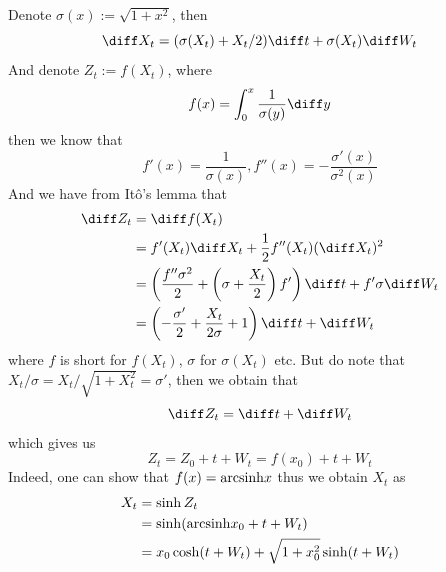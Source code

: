 \begin{subproblem}
        \item
        Denote
        $\sigma(x):=\sqrt{1+x^2}$, then
        \[\diff X_t=(\sigma(X_t)+X_t/2)\diff t+\sigma(X_t)\diff W_t\]
        And denote $Z_t:=f(X_t)$, where
        \[f(x)=\int_0^x\frac{1}{\sigma(y)}\diff y\]
        then we know that
        \[f'(x)=\frac{1}{\sigma(x)},f''(x)=-\frac{\sigma'(x)}{\sigma^2(x)}\]
        And we have from It\^o's lemma that
        \[\begin{aligned}
            \diff Z_t&=\diff f(X_t)\\
            &=f'(X_t)\diff X_t+\frac{1}{2}f''(X_t)(\diff X_t)^2\\
            &=\left(\frac{f''\sigma^2}{2}
            +\left(\sigma+\frac{X_t}{2}\right)f'\right)\diff t
            +f'\sigma\diff W_t\\
            &=\left(-\frac{\sigma'}{2}+\frac{X_t}{2\sigma}+1\right)\diff t+\diff W_t
        \end{aligned}\]
        where $f$ is short for $f(X_t)$, $\sigma$ for $\sigma(X_t)$ etc.
        But do note that $X_t/\sigma=X_t/\sqrt{1+X_t^2}=\sigma'$, then
        we obtain that
        \[\diff Z_t=\diff t+\diff W_t\]
        which gives us
        \[Z_t=Z_0+t+W_t=f(x_0)+t+W_t\]
        Indeed, one can show that $f(x)=\mathrm{arcsinh} x$
        thus we obtain $X_t$ as
        \[\begin{aligned}
            X_t&=\sinh Z_t\\
            &=\sinh(\mathrm{arcsinh} x_0+t+W_t)\\
            &=x_0\cosh(t+W_t)+\sqrt{1+x_0^2}\sinh(t+W_t)
        \end{aligned}\]
    \end{subproblem}
    
